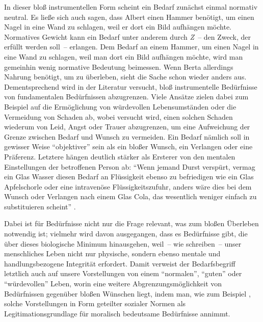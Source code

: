\documentclass[justified,nobib,nohyper,symmetric,twoside]{tufte-book}
\begin{document}
In dieser bloß instrumentellen Form scheint ein Bedarf zunächst einmal normativ neutral.
Es ließe sich auch sagen, dass Albert einen Hammer benötigt, um einen Nagel in eine Wand zu schlagen, weil er dort ein Bild aufhängen möchte.
Normatives Gewicht kann ein Bedarf unter anderem durch \textit{Z}~-- den Zweck, der erfüllt werden soll~-- erlangen.
Dem Bedarf an einem Hammer, um einen Nagel in eine Wand zu schlagen, weil man dort ein Bild aufhängen möchte, wird man gemeinhin wenig normative Bedeutung beimessen.
Wenn Berta allerdings Nahrung benötigt, um zu überleben, sieht die Sache schon wieder anders aus.
Dementsprechend wird in der Literatur versucht, bloß instrumentelle Bedürfnisse von fundamentalen Bedürfnissen abzugrenzen.
Viele Ansätze zielen dabei zum Beispiel auf die Ermöglichung von würdevollen Lebensumständen oder die Vermeidung von Schaden ab, wobei versucht wird, einen solchen Schaden wiederum von Leid, Angst oder Trauer abzugrenzen, um eine Aufweichung der Grenze zwischen Bedarf und Wunsch zu vermeiden.
Ein Bedarf nämlich soll in gewisser Weise \enquote{objektiver} sein als ein bloßer Wunsch, ein Verlangen oder eine Präferenz.
Letztere hängen deutlich stärker als Ersterer von den mentalen Einstellungen der betroffenen Person ab: \enquote{Wenn jemand Durst verspürt, vermag ein Glas Wasser diesen Bedarf an Flüssigkeit ebenso zu befriedigen wie ein Glas Apfelschorle oder eine intravenöse Flüssigkeitszufuhr, anders wäre dies bei dem Wunsch oder Verlangen nach einem Glas Cola, das wesentlich weniger einfach zu substituieren scheint} \citep[S.~305]{bauer_gerechtigkeit_2019}.

Dabei ist für Bedürfnisse nicht nur die Frage relevant, was zum bloßen Überleben notwendig ist; vielmehr wird davon ausgegangen, dass es Bedürfnisse gibt, die über dieses biologische Minimum hinausgehen, weil~-- wie \citet[S.~32]{siebel_need_2020} schreiben~-- unser menschliches Leben nicht nur physische, sondern ebenso mentale und handlungsbezogene Integrität erfordert.
Damit verweist der Bedarfs\-begriff letztlich auch auf unsere Vorstellungen von einem \enquote{normalen}, \enquote{guten} oder \enquote{würdevollen} Leben, worin eine weitere Abgrenzungsmöglichkeit von Bedürfnissen gegenüber bloßen Wünschen liegt, indem man, wie zum Beispiel \citet{miller_principles_1999}, solche Vorstellungen in Form geteilter sozialer Normen als Legitimationsgrundlage für moralisch bedeutsame Bedürfnisse annimmt.


\end{document}
